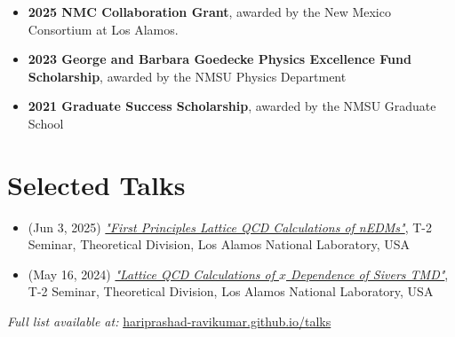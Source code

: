 \documentclass[11pt]{article}
\begin{document}
\begin{itemize}
    \item \textbf{2025 NMC Collaboration Grant}, awarded by the New Mexico Consortium at Los Alamos.
    \item \textbf{2023 George and Barbara Goedecke Physics Excellence Fund Scholarship}, awarded by the NMSU Physics Department

    \item \textbf{2021 Graduate Success Scholarship}, awarded by the NMSU Graduate School
\end{itemize}

\section*{Selected Talks}
\vspace{-0.3em}
\begin{itemize}
    \item (Jun 3, 2025) \href{https://hariprashad-ravikumar.github.io/talks/Los_Alamos_T2_talk_First_Principles_Lattice_QCD_Calculations_of_nEDMs__presentation_Hari_NMSU_June_03_2025.pdf}{\textit{"First Principles Lattice QCD Calculations of nEDMs"}}, T-2 Seminar, Theoretical Division, Los Alamos National Laboratory, USA

    
    \item (May 16, 2024) \href{https://hariprashad-ravikumar.github.io/talks/Lattice_QCD_calculations_of_Sivers_TMD_x_dependance____presentation_Hari__NMSU_May_16_2024.pdf}{\textit{"Lattice QCD Calculations of $x$ Dependence of Sivers TMD"}}, T-2 Seminar, Theoretical Division, Los Alamos National Laboratory, USA
    
\end{itemize}

\noindent\textit{Full list available at:} \href{https://hariprashad-ravikumar.github.io/talks}{hariprashad-ravikumar.github.io/talks}
\end{document}
